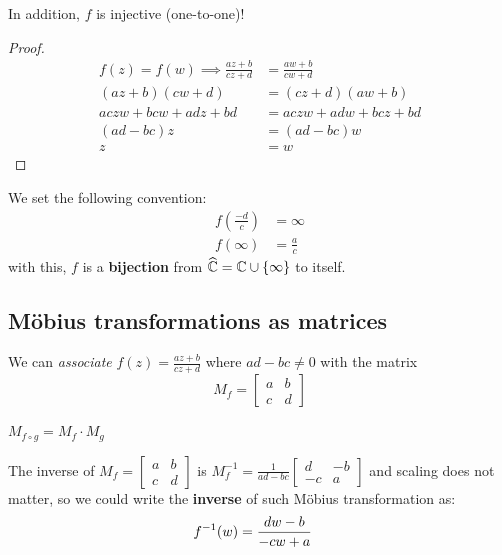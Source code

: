 \documentclass[12pt]{article}
\begin{document}
\rmk In addition, $f$ is injective (one-to-one)!
\begin{proof}
    \begin{align*}
        f(z)=f(w)\implies \frac{az+b}{cz+d}&=\frac{aw+b}{cw+d}\\
         (az+b)(cw+d)&= (cz+d)(aw+b)\\
         aczw+bcw+adz+bd&=aczw+adw+bcz+bd\\
         (ad-bc)z&=(ad-bc)w\\
         z&=w
    \end{align*}
\end{proof}

 We set the following convention:\begin{align*}
    f(\frac{-d}{c})&= \infty\\
    f(\infty) &= \frac{a}{c}
\end{align*}
with this, $f$ is a \textbf{bijection} from $\widehat{\mathbb{C}}=\mathbb{C}\cup\{\infty\}$ to itself.

\subsection{Möbius transformations as matrices}
\rmk We can \textit{associate} $f(z)=\frac{az+b}{cz+d}$ where $ad-bc\neq 0$ with the matrix $$M_f=\begin{bmatrix}
    a&b\\c&d
\end{bmatrix}$$

\rmk $M_{f\circ g}=M_f\cdot M_g$

\rmk The inverse of $M_f=\begin{bmatrix}
    a&b\\c&d
\end{bmatrix}$ is $M_f^{-1}=\frac{1}{ad-bc}\begin{bmatrix}
    d&-b\\-c&a
\end{bmatrix}$ and scaling does not matter, so we could write the \textbf{inverse} of such Möbius transformation as: \begin{align*}
    f^{-1}(w) &=\frac{dw-b}{-cw+a}
\end{align*}
\end{document}
